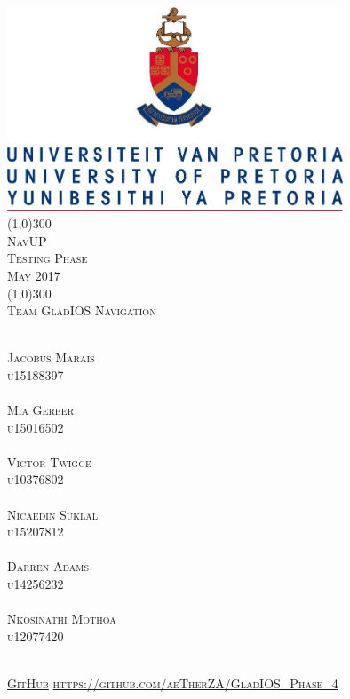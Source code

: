 \documentclass[runningheads,a4paper]{article}
\begin{document}
\begin{titlepage}
\begin{center}
\includegraphics[width=10cm]{UP.jpg}  \\
[1cm]
\line(1,0){300} \\
[0.3cm]
\textsc{\Large
NavUP \\
Testing Phase \\
\hfill {} May 2017
}\\
[0.1cm]
\line(1,0){300} \\
[0.7cm]
\textsc{\Large
Team GladIOS Navigation
} \\
\end{center}
\begin{center}
\begin{multicols}{2}
\textsc{\large\\
Jacobus Marais\\ 
u15188397\\ 
}
\textsc{\large\\
Mia Gerber\\
u15016502\\ 
}
\textsc{\large\\
Victor Twigge\\
u10376802\\ 
}
\columnbreak
\textsc{\large\\
Nicaedin Suklal\\
u15207812\\
}
\textsc{\large\\
Darren Adams\\
u14256232\\
}
\textsc{\large\\
Nkosinathi Mothoa\\
u12077420\\
}
\end{multicols}
\textsc{	\\ \href{https://github.com/aeTherZA/GladIOS_Phase_4}{GitHub}
\url{https://github.com/aeTherZA/GladIOS_Phase_4}}
\end{center}
\end{titlepage}
\end{document}
